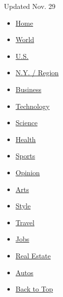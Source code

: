 Updated Nov. 29

\begin{itemize}
\tightlist
\item
  \href{//www.nytimes3xbfgragh.onion}{Home}
\item
  \href{//www.nytimes3xbfgragh.onion/pages/world/index.html}{World}
\item
  \href{//www.nytimes3xbfgragh.onion/pages/national/index.html}{U.S.}
\item
  \href{//www.nytimes3xbfgragh.onion/pages/nyregion/index.html}{N.Y. /
  Region}
\item
  \href{//www.nytimes3xbfgragh.onion/pages/business/index.html}{Business}
\item
  \href{//www.nytimes3xbfgragh.onion/pages/technology/index.html}{Technology}
\item
  \href{//www.nytimes3xbfgragh.onion/pages/science/index.html}{Science}
\item
  \href{//www.nytimes3xbfgragh.onion/pages/health/index.html}{Health}
\item
  \href{//www.nytimes3xbfgragh.onion/pages/sports/index.html}{Sports}
\item
  \href{//www.nytimes3xbfgragh.onion/pages/opinion/index.html}{Opinion}
\item
  \href{//www.nytimes3xbfgragh.onion/pages/arts/index.html}{Arts}
\item
  \href{//www.nytimes3xbfgragh.onion/pages/style/index.html}{Style}
\item
  \href{//www.nytimes3xbfgragh.onion/pages/travel/index.html}{Travel}
\item
  \href{//www.nytimes3xbfgragh.onion/pages/jobs/index.html}{Jobs}
\item
  \href{//www.nytimes3xbfgragh.onion/pages/realestate/index.html}{Real
  Estate}
\item
  \href{//www.nytimes3xbfgragh.onion/pages/automobiles/index.html}{Autos}
\item
  \protect\hyperlink{top}{Back to Top}
\end{itemize}

